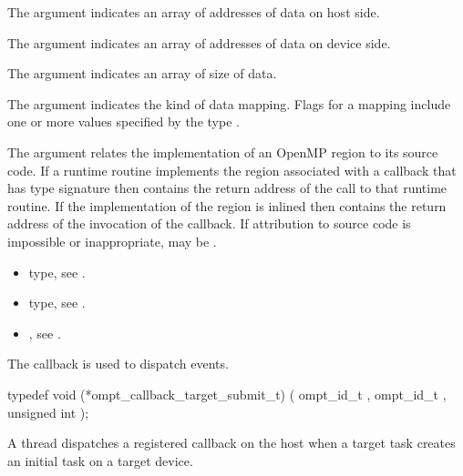 The argument  indicates an array of addresses of
data on host side.

The argument  indicates an array of addresses
of data on device side.

The argument  indicates an array of size of data.

The argument  indicates the kind of data
mapping. Flags for a mapping include one or more values specified by the type
.

The  argument relates the implementation of an OpenMP region
to its source code. If a runtime routine implements the region associated with
a callback that has type signature  then
 contains the return address of the call to that runtime routine.
If the implementation of the region is inlined then  contains the
return address of the invocation of the callback. If attribution to source code
is impossible or inappropriate, may be .


\crossreferences
\begin{itemize}
\item {} type, see
.
\item {} type, see
.
\item {},
see .
\end{itemize}


\label{sec:ompt_callback_target_submit_t}
\summary
The  callback is used to dispatch
 events.

\format

\begin{ccppspecific}
\begin{omptCallback}
typedef void (*ompt_callback_target_submit_t) (
  ompt_id_t ,
  ompt_id_t ,
  unsigned int 
);
\end{omptCallback}
\end{ccppspecific}


\descr
A thread dispatches a registered  callback on the host when
a target task creates an initial task on a target device.

